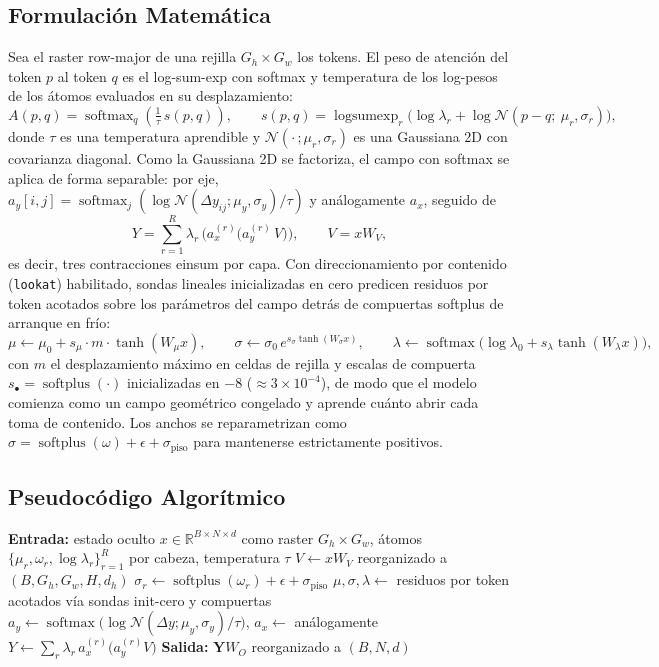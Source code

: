 \subsection{Formulación Matemática}
Sea el raster row-major de una rejilla $G_h \times G_w$ los tokens. El peso de atención del token $p$ al token $q$ es el log-sum-exp con softmax y temperatura de los log-pesos de los átomos evaluados en su desplazamiento:
\[
A(p, q) = \operatorname{softmax}_q\!\left( \tfrac{1}{\tau}\, s(p, q) \right),
\qquad
s(p, q) = \operatorname{logsumexp}_r \big( \log \lambda_r + \log \mathcal{N}(p - q;\ \mu_r, \sigma_r) \big),
\]
donde $\tau$ es una temperatura aprendible y $\mathcal{N}(\cdot\,;\mu_r, \sigma_r)$ es una Gaussiana 2D con covarianza diagonal. Como la Gaussiana 2D se factoriza, el campo con softmax se aplica de forma separable: por eje, $a_y[i, j] = \operatorname{softmax}_j(\log \mathcal{N}(\Delta y_{ij}; \mu_y, \sigma_y) / \tau)$ y análogamente $a_x$, seguido de
\[
Y = \sum_{r=1}^{R} \lambda_r\, \big( a_x^{(r)} \big( a_y^{(r)}\, V \big) \big),
\qquad V = x W_V,
\]
es decir, tres contracciones einsum por capa. Con direccionamiento por contenido (\texttt{lookat}) habilitado, sondas lineales inicializadas en cero predicen residuos por token acotados sobre los parámetros del campo detrás de compuertas softplus de arranque en frío:
\[
\mu \leftarrow \mu_0 + s_\mu \cdot m \cdot \tanh(W_\mu x), \qquad
\sigma \leftarrow \sigma_0 \, e^{s_\sigma \tanh(W_\sigma x)}, \qquad
\lambda \leftarrow \operatorname{softmax}\big( \log \lambda_0 + s_\lambda \tanh(W_\lambda x) \big),
\]
con $m$ el desplazamiento máximo en celdas de rejilla y escalas de compuerta $s_\bullet = \operatorname{softplus}(\cdot)$ inicializadas en $-8$ ($\approx 3 \times 10^{-4}$), de modo que el modelo comienza como un campo geométrico congelado y aprende cuánto abrir cada toma de contenido. Los anchos se reparametrizan como $\sigma = \operatorname{softplus}(\omega) + \epsilon + \sigma_{\text{piso}}$ para mantenerse estrictamente positivos.

\subsection{Pseudocódigo Algorítmico}
\begin{algorithmic}[1]
\State \textbf{Entrada:} estado oculto $x \in \mathbb{R}^{B \times N \times d}$ como raster $G_h \times G_w$, átomos $\{\mu_r, \omega_r, \log \lambda_r\}_{r=1}^{R}$ por cabeza, temperatura $\tau$
\State $V \gets x W_V$ reorganizado a $(B, G_h, G_w, H, d_h)$ 
\State $\sigma_r \gets \operatorname{softplus}(\omega_r) + \epsilon + \sigma_{\text{piso}}$ 
    \State $\mu, \sigma, \lambda \gets$ residuos por token acotados vía sondas init-cero y compuertas 
\EndIf
\State $a_y \gets \operatorname{softmax}\!\big(\log \mathcal{N}(\Delta y; \mu_y, \sigma_y) / \tau\big)$, \quad $a_x \gets$ análogamente 
\State $Y \gets \sum_r \lambda_r\, a_x^{(r)} \big( a_y^{(r)} V \big)$ 
\State \textbf{Salida:} $\mathbf{Y} W_O$ reorganizado a $(B, N, d)$
\end{algorithmic}

